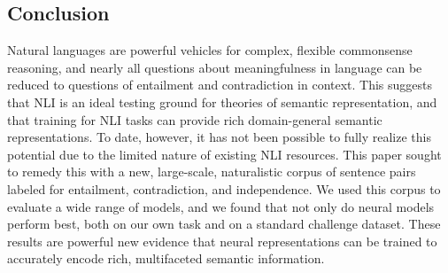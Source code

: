 \subsection{Conclusion}\label{sec:conclusion}

Natural languages are powerful vehicles for complex, flexible
commonsense reasoning, and nearly all questions about meaningfulness
in language can be reduced to questions of entailment
and contradiction in context. This suggests that NLI is an ideal testing ground
for theories of semantic representation, and that training for NLI
tasks can provide rich domain-general semantic representations.  To
date, however, it has not been possible to fully realize this
potential due to the limited nature of existing NLI resources.  This
paper sought to remedy this with a new, large-scale, naturalistic
corpus of sentence pairs labeled for entailment, contradiction, and
independence. We used this corpus to evaluate a wide range of models,
and we found that not only do neural models perform best, both on our own
task and on a standard challenge dataset.
These results are powerful new evidence that neural representations
can be trained to accurately encode rich, multifaceted semantic
information.
